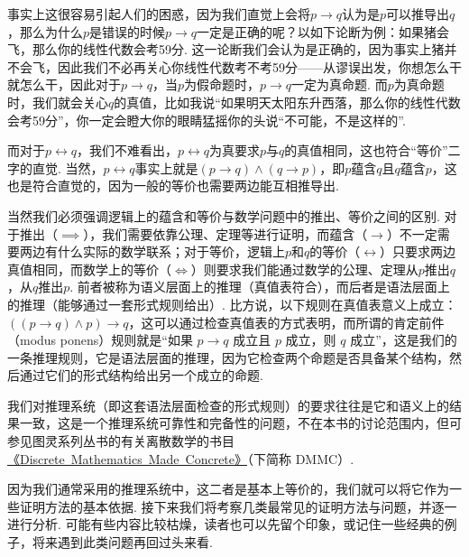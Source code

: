 事实上这很容易引起人们的困惑，因为我们直觉上会将$p\to q$认为是$p$可以推导出$q$，那么为什么$p$是错误的时候$p\to q$一定是正确的呢？以如下论断为例：如果猪会飞，那么你的线性代数会考59分. 这一论断我们会认为是正确的，因为事实上猪并不会飞，因此我们不必再关心你线性代数考不考59分——从谬误出发，你想怎么干就怎么干，因此对于$p\to q$，当$p$为假命题时，$p\to q$一定为真命题. 而$p$为真命题时，我们就会关心$q$的真值，比如我说``如果明天太阳东升西落，那么你的线性代数会考59分''，你一定会瞪大你的眼睛猛摇你的头说``不可能，不是这样的''.

而对于$p\leftrightarrow q$，我们不难看出，$p\leftrightarrow q$为真要求$p$与$q$的真值相同，这也符合``等价''二字的直觉. 当然，$p\leftrightarrow q$事实上就是$(p\to q)\land(q\to p)$，即$p$蕴含$q$且$q$蕴含$p$，这也是符合直觉的，因为一般的等价也需要两边能互相推导出.

当然我们必须强调逻辑上的蕴含和等价与数学问题中的推出、等价之间的区别. 对于推出（$\implies$），我们需要依靠公理、定理等进行证明，而蕴含（$\to$）不一定需要两边有什么实际的数学联系；对于等价，逻辑上$p$和$q$的等价（$\leftrightarrow$）只要求两边真值相同，而数学上的等价（$\iff$）则要求我们能通过数学的公理、定理从$p$推出$q$，从$q$推出$p$. 前者被称为语义层面上的推理（真值表符合），而后者是语法层面上的推理（能够通过一套形式规则给出）. 比方说，以下规则在真值表意义上成立：$((p \to q) \land p) \to q$，这可以通过检查真值表的方式表明，而所谓的肯定前件（modus ponens）规则就是``如果 $p \to q$ 成立且 $p$ 成立，则 $q$ 成立''，这是我们的一条推理规则，它是语法层面的推理，因为它检查两个命题是否具备某个结构，然后通过它们的形式结构给出另一个成立的命题.

我们对推理系统（即这套语法层面检查的形式规则）的要求往往是它和语义上的结果一致，这是一个推理系统可靠性和完备性的问题，不在本书的讨论范围内，但可参见图灵系列丛书的有关离散数学的书目\href{https://github.com/FrightenedFoxCN/Discrete-Mathematics-Made-Concrete}{《Discrete\ Mathematics\ Made\ Concrete》}（下简称 DMMC）.

因为我们通常采用的推理系统中，这二者是基本上等价的，我们就可以将它作为一些证明方法的基本依据. 接下来我们将考察几类最常见的证明方法与问题，并逐一进行分析. 可能有些内容比较枯燥，读者也可以先留个印象，或记住一些经典的例子，将来遇到此类问题再回过头来看.

